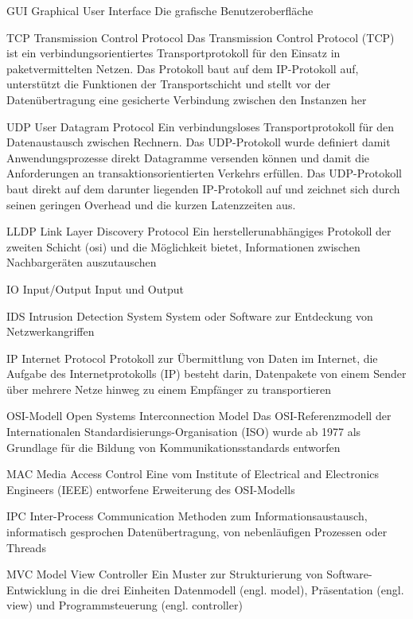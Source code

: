
	{GUI}
	{Graphical User Interface}
	{Die grafische Benutzeroberfläche}

	{TCP}
	{Transmission Control Protocol}
	{Das Transmission Control Protocol (TCP) ist ein verbindungsorientiertes Transportprotokoll für den Einsatz in paketvermittelten Netzen. Das Protokoll baut auf dem IP-Protokoll auf, unterstützt die Funktionen der Transportschicht und stellt vor der Datenübertragung eine gesicherte Verbindung zwischen den Instanzen her}

	{UDP}
	{User Datagram Protocol}
	{Ein verbindungsloses Transportprotokoll für den Datenaustausch zwischen Rechnern. Das UDP-Protokoll wurde definiert damit Anwendungsprozesse direkt Datagramme versenden können und damit die Anforderungen an transaktionsorientierten Verkehrs erfüllen. Das UDP-Protokoll baut direkt auf dem darunter liegenden IP-Protokoll auf und zeichnet sich durch seinen geringen Overhead und die kurzen Latenzzeiten aus.}

	{LLDP}
	{Link Layer Discovery Protocol}
	{Ein herstellerunabhängiges Protokoll der zweiten Schicht (\gls{osi}) und die Möglichkeit bietet, Informationen zwischen Nachbargeräten auszutauschen}
	
	{IO}
	{Input/Output}
	{Input und Output}


	{IDS}
	{Intrusion Detection System}
	{System oder Software zur Entdeckung von Netzwerkangriffen}


	{IP}
	{Internet Protocol}
	{Protokoll zur Übermittlung von Daten im Internet, die Aufgabe des Internetprotokolls (IP) besteht darin, Datenpakete von einem Sender über mehrere Netze hinweg zu einem Empfänger zu transportieren}
	
	{OSI-Modell}
	{Open Systems Interconnection Model}
	{Das OSI-Referenzmodell der Internationalen Standardisierungs-Organisation (ISO) wurde ab 1977 als Grundlage für die Bildung von Kommunikationsstandards entworfen}


	{MAC}
	{Media Access Control}
	{Eine vom Institute of Electrical and Electronics Engineers (IEEE) entworfene Erweiterung des OSI-Modells}


	{IPC}
	{Inter-Process Communication}
	{Methoden zum Informationsaustausch, informatisch gesprochen Datenübertragung, von nebenläufigen Prozessen oder Threads}


	{MVC}
	{Model View Controller}
	{Ein Muster zur Strukturierung von Software-Entwicklung in die drei Einheiten Datenmodell (engl. model), Präsentation (engl. view) und Programmsteuerung (engl. controller)}


